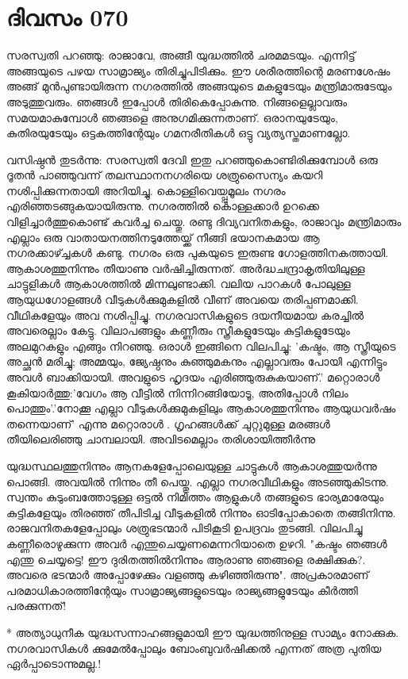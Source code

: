 \newpage
\section{ദിവസം 070}


സരസ്വതി പറഞ്ഞു: രാജാവേ, അങ്ങീ യുദ്ധത്തില്‍ ചരമമടയും. എന്നിട്ട്‌ അങ്ങയുടെ പഴയ സാമ്രാജ്യം തിരിച്ചുപിടിക്കും. ഈ ശരീരത്തിന്റെ മരണശേഷം അങ്ങ്‌ മുന്‍പുണ്ടായിരുന്ന നഗരത്തില്‍ അങ്ങയുടെ മകളുടേയും മന്ത്രിമാരുടേയും അടുത്തുവരും. ഞങ്ങള്‍ ഇപ്പോള്‍ തിരികെപ്പോകുന്നു. നിങ്ങളെല്ലാവരും സമയമാകുമ്പോള്‍ ഞങ്ങളെ അനുഗമിക്കുന്നതാണ്‌. ഒരാനയുടേയും, കുതിരയുടേയും ഒട്ടകത്തിന്റേയും ഗമനരീതികള്‍ ഒട്ടു വ്യത്യസ്തമാണല്ലോ.

വസിഷ്ഠന്‍ തുടര്‍ന്നു: സരസ്വതി ദേവി ഇതു പറഞ്ഞുകൊണ്ടിരിക്കുമ്പോള്‍ ഒരു ദൂതന്‍ പാഞ്ഞുവന്ന് തലസ്ഥാനനഗരിയെ ശത്രുസൈന്യം കയറി നശിപ്പിക്കുന്നതായി അറിയിച്ചു. കൊള്ളിവെയ്പ്പുമൂലം നഗരം എരിഞ്ഞടങ്ങുകയായിരുന്നു. നഗരത്തില്‍ കൊള്ളക്കാര്‍ ഉറക്കെ വിളിച്ചാര്‍ത്തുകൊണ്ട്‌ കവര്‍ച്ച ചെയ്തു. രണ്ടു ദിവ്യവനിതകളും, രാജാവും മന്ത്രിമാരും എല്ലാം ഒരു വാതായനത്തിനടുത്തേയ്ക്ക്‌ നീങ്ങി ഭയാനകമായ ആ നഗരക്കാഴ്ച്ചകള്‍ കണ്ടു. നഗരം ഒരു പുകയുടെ ഇരുണ്ട ഗോളത്തിനകത്തായി. ആകാശത്തുനിന്നും തീയാണു വര്‍ഷിച്ചിരുന്നത്‌. അര്‍ദ്ധചന്ദ്രാകൃതിയിലുള്ള ചാട്ടുളികള്‍ ആകാശത്തില്‍ മിന്നലുണ്ടാക്കി. വലിയ പാറകള്‍ പോലുള്ള ആയുധഗോളങ്ങള്‍ വീടുകള്‍ക്കുമുകളില്‍ വീണ്‌ അവയെ തരിപ്പണമാക്കി. വീഥികളേയും അവ നശിപ്പിച്ചു. നഗരവാസികളുടെ ദയനീയമായ കരച്ചില്‍ അവരെല്ലാം കേട്ടു. വിലാപങ്ങളും കണ്ണീരും സ്ത്രീകളുടേയും കുട്ടികളുടേയും അലമുറകളും എങ്ങും നിറഞ്ഞു. ഒരാള്‍ ഇങ്ങിനെ വിലപിച്ചു: 'കഷ്ടം, ആ സ്ത്രീയുടെ അച്ഛന്‍ മരിച്ചു; അമ്മയും, ജ്യേഷ്ഠനും കുഞ്ഞുമകനും എല്ലാവരും പോയി എന്നിട്ടും അവള്‍ ബാക്കിയായി. അവളുടെ ഹൃദയം എരിഞ്ഞുരുകുകയാണ്‌.' മറ്റൊരാള്‍ കൂകിയാര്‍ത്തു:'വേഗം ആ വീട്ടില്‍ നിന്നിറങ്ങിയോടൂ, അതിപ്പോള്‍ നിലം പൊത്തും'.'നോക്കൂ എല്ലാ വീടുകള്‍ക്കുമുകളിലും ആകാശത്തുനിന്നും ആയുധവര്‍ഷം തന്നെയാണ്‌' എന്നു മറ്റൊരാള്‍ . ഗൃഹങ്ങള്‍ക്ക്‌ ചുറ്റുമുള്ള മരങ്ങള്‍ തീയിലെരിഞ്ഞു ചാമ്പലായി. അവിടമെല്ലാം തരിശായിത്തീര്‍ന്നു

യുദ്ധസ്ഥലത്തുനിന്നും ആനകളേപ്പോലെയുള്ള ചാട്ടുകള്‍ ആകാശത്തുയര്‍ന്നു പൊങ്ങി. അവയില്‍ നിന്നും തീ പെയ്തു. എല്ലാ നഗരവീഥികളും അടഞ്ഞുകിടന്നു. സ്വന്തം കുടുംബത്തോടുള്ള ഒട്ടല്‍ നിമിത്തം ആളുകള്‍ തങ്ങളുടെ ഭാര്യമാരേയും കുട്ടികളേയും തിരഞ്ഞ്‌ തീപിടിച്ച വീടുകളില്‍ നിന്നും ഓടിപ്പോകാതെ തങ്ങിനിന്നു. രാജവനിതകളേപ്പോലും ശത്രുഭടന്മാര്‍ പിടികൂടി ഉപദ്രവം തുടങ്ങി. വിലപിച്ചു കണ്ണീരൊഴുക്കുന്ന അവര്‍ എന്തുചെയ്യണമെന്നറിയാതെ ഉഴറി. "കഷ്ടം ഞങ്ങള്‍ എന്തു ചെയ്യട്ടെ! ഈ ദുരിതത്തില്‍നിന്നും ആരാണു ഞങ്ങളെ രക്ഷിക്കുക?. അവരെ ഭടന്മാര്‍ അപ്പോഴേക്കും വളഞ്ഞു കഴിഞ്ഞിരുന്നു". അപ്രകാരമാണ്‌ പരമാധികാരത്തിന്റേയും സാമ്രാജ്യങ്ങളുടെയും രാജ്യങ്ങളുടേയും കീര്‍ത്തി പരക്കുന്നത്‌!

* അത്യാധുനീക യുദ്ധസന്നാഹങ്ങളുമായി ഈ യുദ്ധത്തിനുള്ള സാമ്യം നോക്കുക. നഗരവാസികള്‍ ക്കുമേല്‍പ്പോലും ബോംബുവര്‍ഷിക്കല്‍ എന്നത്‌ അത്ര പുതിയ ഏര്‍പ്പാടൊന്നുമല്ല.!

